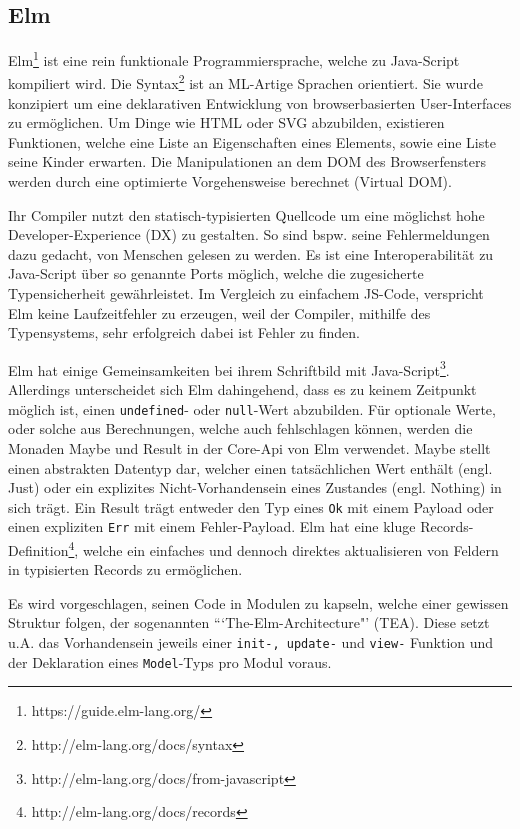 \subsection{Elm}
Elm\footnote{https://guide.elm-lang.org/} ist eine rein funktionale Programmiersprache, welche zu Java-Script kompiliert wird.
Die Syntax\footnote{http://elm-lang.org/docs/syntax} ist an ML-Artige Sprachen orientiert.
Sie wurde konzipiert um eine deklarativen Entwicklung von browserbasierten User-Interfaces zu ermöglichen.
Um Dinge wie HTML oder SVG abzubilden, existieren Funktionen, welche eine Liste an Eigenschaften eines Elements, sowie eine Liste seine Kinder erwarten.
Die Manipulationen an dem DOM des Browserfensters werden durch eine optimierte Vorgehensweise berechnet (Virtual DOM).
\par
Ihr Compiler nutzt den statisch-typisierten Quellcode um eine möglichst hohe Developer-Experience (DX) zu gestalten.
So sind \ac{bspw.} seine Fehlermeldungen dazu gedacht, von Menschen gelesen zu werden.
Es ist eine Interoperabilität zu Java-Script über so genannte Ports möglich, welche die zugesicherte Typensicherheit gewährleistet.
Im Vergleich zu einfachem JS-Code, verspricht Elm keine Laufzeitfehler zu erzeugen, weil der Compiler, mithilfe des Typensystems, sehr erfolgreich dabei ist Fehler zu finden.
\par
Elm hat einige Gemeinsamkeiten bei ihrem Schriftbild mit Java-Script\footnote{http://elm-lang.org/docs/from-javascript}.
Allerdings unterscheidet sich Elm dahingehend, dass es zu keinem Zeitpunkt möglich ist, einen \texttt{undefined}- oder \texttt{null}-Wert abzubilden.
Für optionale Werte, oder solche aus Berechnungen, welche auch fehlschlagen können, werden die Monaden Maybe und Result in der Core-Api von Elm verwendet.
Maybe stellt einen abstrakten Datentyp dar, welcher einen tatsächlichen Wert enthält (engl. Just) oder ein explizites Nicht-Vorhandensein eines Zustandes (engl. Nothing) in sich trägt.
Ein Result trägt entweder den Typ eines \texttt{Ok} mit einem Payload oder einen expliziten \texttt{Err} mit einem Fehler-Payload.
Elm hat eine kluge Records-Definition\footnote{http://elm-lang.org/docs/records}, welche ein einfaches und dennoch direktes aktualisieren von Feldern in typisierten Records zu ermöglichen.
\par
Es wird vorgeschlagen, seinen Code in Modulen zu kapseln, welche einer gewissen Struktur folgen, der sogenannten “`The-Elm-Architecture"' (TEA).
Diese setzt \ac{u.A.} das Vorhandensein jeweils einer \texttt{init-, update-} und \texttt{view-} Funktion und der Deklaration eines \texttt{Model}-Typs pro Modul voraus.
